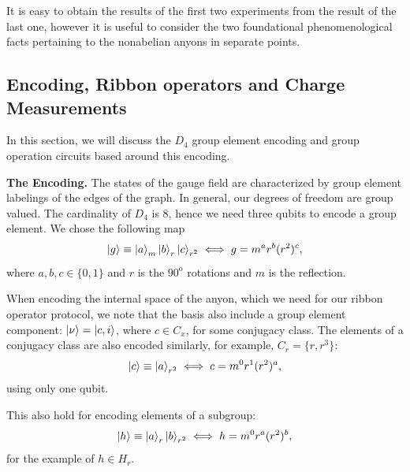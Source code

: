 \documentclass[two column]{article}
\newcommand{\caro}[1]{\textcolor{red}{[#1]}}
\begin{document}
It is easy to obtain the results of the first two experiments from the result of the last one, however it is useful to consider the two foundational phenomenological facts pertaining to the nonabelian anyons in separate points.

\subsection{Encoding, Ribbon operators and Charge Measurements}\label{subsec:enc}

In this section, we will discuss the $D_4$ group element encoding and group operation circuits based around this encoding.

\textbf{The Encoding.} The states of the gauge field are characterized by group element labelings of the edges of the graph.
In general, our degrees of freedom are group valued.
The cardinality of $D_4$ is 8, hence we need three qubits to encode a group element.
We chose the following map
\begin{equation}
    \ket{g} \equiv \ket{a}_m\ket{b}_r\ket{c}_{r^2} \iff g = m^a r^b (r^2)^c,
\end{equation}
where $a,b,c \in \{0,1\}$ and $r$ is the $90^{\text{o}}$ rotations and $m$ is the reflection.

When encoding the internal space of the anyon, which we need for our ribbon operator protocol, we note that the basis also include a group element component: $\ket{\nu} = \ket{c, i}$, where $c \in C_x$, for some conjugacy class.
The elements of a conjugacy class are also encoded similarly, for example, $C_r = \{r, r^3\}$:
\begin{equation}
    \ket{c} \equiv \ket{a}_{r^2} \iff c = m^0r^1(r^2)^a,
\end{equation}
using only one qubit.

This also hold for encoding elements of a subgroup:
\begin{equation}
    \ket{h} \equiv \ket{a}_r\ket{b}_{r^2} \iff h = m^0r^a(r^2)^b,
\end{equation}
for the example of $h \in H_r$.

\end{document}
